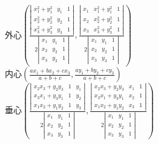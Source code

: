 \begin{itemize}
\begin{itemize}
					\\外心$ \left(\frac{\left|\begin{array}{cccc}
							x_1^2 + y_1^2 & y_1 & 1\\
							x_2^2 + y_2^2 & y_2 & 1\\
							x_3^2 + y_3^2 & y_3 & 1
						\end{array}\right|}{2 \left|\begin{array}{cccc}
							x_1 & y_1 & 1\\
							x_2 & y_2 & 1\\
							x_3 & y_3 & 1
						\end{array}\right|}, \frac{\left|\begin{array}{cccc}
							x_1 & x_1^2 + y_1^2 & 1\\
							x_2 & x_2^2 + y_2^2 & 1\\
							x_3 & x_3^2 + y_3^2 & 1
						\end{array}\right|}{2\left|\begin{array}{cccc}
							x_1 & y_1 & 1\\
							x_2 & y_2 & 1\\
							x_3 & y_3 & 1
						\end{array}\right|}\right) $
					\\内心$ \left(\frac{a x_1 + b x_2 + c x_3}{a + b + c}, \frac{a y_1 + b y_2 + c y_3}{a + b + c}\right) $
					\\垂心$ \left(\frac{\left|\begin{array}{cccc}
						x_2 x_3 + y_2 y_3 & 1 & y_1\\
						x_3 x_1 + y_3 y_1 & 1 & y_2\\
						x_1 x_2 + y_1 y_2 & 1 & y_3
						\end{array}\right|}{2 \left|\begin{array}{cccc}
						x_1 & y_1 & 1\\
						x_2 & y_2 & 1\\
						x_3 & y_3 & 1
						\end{array}\right|}, \frac{\left|\begin{array}{cccc}
						x_2 x_3 + y_2 y_3 & x_1 & 1\\
						x_3 x_1 + y_3 y_1 & x_2 & 1\\
						x_1 x_2 + y_1 y_2 & x_3 & 1
						\end{array}\right|}{2\left|\begin{array}{cccc}
						x_1 & y_1 & 1\\
						x_2 & y_2 & 1\\
						x_3 & y_3 & 1
						\end{array}\right|}\right) $
			\end{itemize}
	\end{itemize}